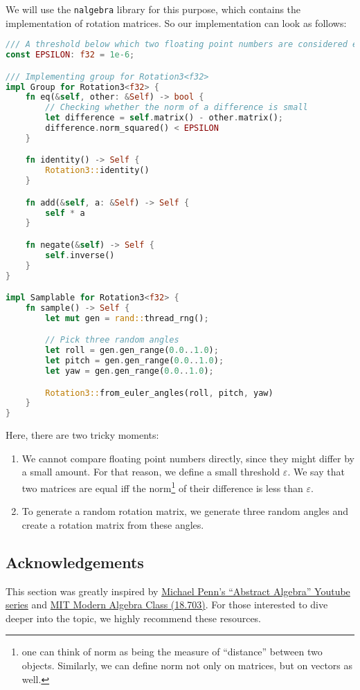 \documentclass[../lecture-notes-148x210.tex]{subfiles}
\begin{document}
We will use the \texttt{nalgebra} library for this purpose, which contains the implementation of rotation matrices. 
So our implementation can look as follows:
\begin{lstlisting}[language=Rust]
/// A threshold below which two floating point numbers are considered equal.
const EPSILON: f32 = 1e-6;

/// Implementing group for Rotation3<f32>
impl Group for Rotation3<f32> {
    fn eq(&self, other: &Self) -> bool {
        // Checking whether the norm of a difference is small
        let difference = self.matrix() - other.matrix();
        difference.norm_squared() < EPSILON
    }

    fn identity() -> Self {
        Rotation3::identity()
    }

    fn add(&self, a: &Self) -> Self {
        self * a
    }

    fn negate(&self) -> Self {
        self.inverse()
    }
}

impl Samplable for Rotation3<f32> {
    fn sample() -> Self {
        let mut gen = rand::thread_rng();

        // Pick three random angles
        let roll = gen.gen_range(0.0..1.0);
        let pitch = gen.gen_range(0.0..1.0);
        let yaw = gen.gen_range(0.0..1.0);

        Rotation3::from_euler_angles(roll, pitch, yaw)
    }
}
\end{lstlisting}

Here, there are two tricky moments:
\begin{enumerate}
    \item We cannot compare floating point numbers directly, since they might differ by a small amount. For that reason, we define a small threshold $\varepsilon$. We say that two matrices are equal iff the norm\footnote{one can think of norm as being the measure of ``distance'' between two objects. Similarly, we can define norm not only on matrices, but on vectors as well.} of their difference is less than $\varepsilon$.
    \item To generate a random rotation matrix, we generate three random angles and create a rotation matrix from these angles.
\end{enumerate}

\subsection*{Acknowledgements}
This section was greatly inspired by
\href{https://www.youtube.com/watch?v=j5nkkCp0ARw&list=PLVMgvCDIRy1y4JFpnpzEQZ0gRwr-sPTpw}{Michael
Penn's ``Abstract Algebra'' Youtube series} and
\href{https://ocw.mit.edu/courses/18-703-modern-algebra-spring-2013/}{MIT Modern
Algebra Class (18.703)}. For those interested to dive deeper into the topic, we
highly recommend these resources.
\end{document}
